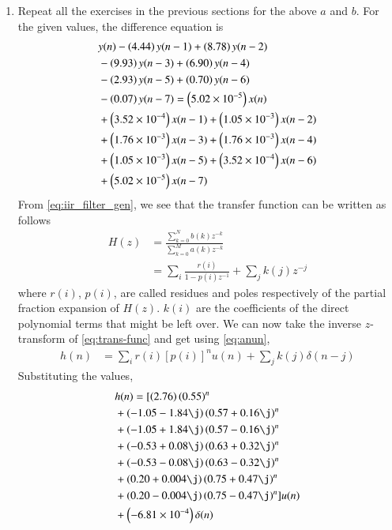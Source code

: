 \documentclass[journal,12pt,twocolumn]{IEEEtran}
\renewcommand\thesection{\arabic{section}}
\begin{document}
\begin{enumerate}[label=\thesection.\arabic*]
\item Repeat all the exercises in the previous sections for the above $a$ and $b$.
\solution
For the given values, the difference equation is
\begin{align}
	&y(n) - \left(4.44\right)y(n - 1) + \left(8.78\right)y(n - 2) \nonumber \\
	&- \left(9.93\right)y(n - 3) + \left(6.90\right)y(n - 4) \nonumber \\
	&- \left(2.93\right)y(n - 5) \nonumber + \left(0.70\right)y(n - 6) \nonumber \\
	&- \left(0.07\right)y(n - 7) = \left(5.02 \times 10^{-5}\right)x(n) \nonumber \\
	&+ \left(3.52 \times 10^{-4}\right)x(n - 1) + \left(1.05 \times 10^{-3}\right)x(n - 2) \nonumber \\
	&+ \left(1.76 \times 10^{-3}\right)x(n - 3) + \left(1.76 \times 10^{-3}\right)x(n - 4) \nonumber \\
	&+ \left(1.05 \times 10^{-3}\right)x(n - 5) + \left(3.52 \times 10^{-4}\right)x(n - 6) \nonumber \\
	&+ \left(5.02 \times 10^{-5}\right)x(n - 7)
\end{align}
From \eqref{eq:iir_filter_gen}, we see that the transfer function can be written as follows
\begin{align}
	H(z) &= \frac{\sum_{k = 0}^{N}b(k)z^{-k}}{\sum_{k = 0}^{M}a(k)z^{-k}} \\
		 &= \sum_{i}\frac{r(i)}{1 - p(i)z^{-1}} + \sum_{j}k(j)z^{-j}
	\label{eq:trans-func}
\end{align}
where $r(i)$, $p(i)$, are called residues and poles respectively of the partial 
fraction expansion of $H(z)$. $k(i)$ are the coefficients of the direct polynomial 
terms that might be left over. We can now take the inverse $z$-transform of
\eqref{eq:trans-func} and get using \eqref{eq:anun},
\begin{align}
	h(n) &= \sum_{i}r(i)[p(i)]^nu(n) + \sum_{j}k(j)\delta(n - j)
	\label{eq:h-n-expr}
\end{align}
Substituting the values,
\begin{align}
	&h(n) = [\brak{2.76}\brak{0.55}^n \nonumber \\ 
	&+ \brak{-1.05-1.84\j}\brak{0.57+0.16\j}^n \nonumber \\
	&+ \brak{-1.05+1.84\j}\brak{0.57-0.16\j}^n \nonumber \\
	&+ \brak{-0.53+0.08\j}\brak{0.63+0.32\j}^n \nonumber \\
	&+ \brak{-0.53-0.08\j}\brak{0.63-0.32\j}^n \nonumber \\
	&+ \brak{0.20+0.004\j}\brak{0.75+0.47\j}^n \nonumber \\
	&+ \brak{0.20-0.004\j}\brak{0.75-0.47\j}^n]u(n) \nonumber \\
	&+ \brak{-6.81 \times 10^{-4}}\delta(n)
\end{align}


\end{enumerate}
\end{document}
